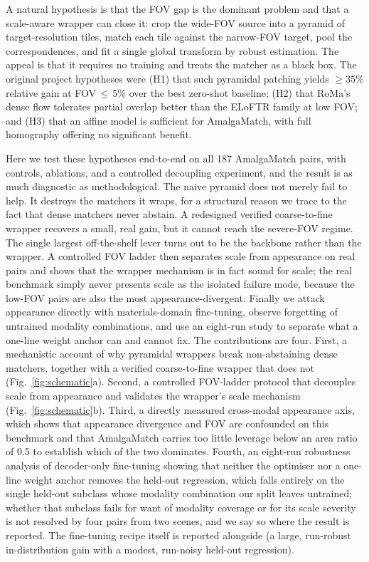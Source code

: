 \documentclass[fleqn,10pt]{wlscirep}
\begin{document}
A natural hypothesis is that the FOV gap is the dominant problem and that a scale-aware wrapper can close it: crop the wide-FOV source into a pyramid of target-resolution tiles, match each tile against the narrow-FOV target, pool the correspondences, and fit a single global transform by robust estimation. The appeal is that it requires no training and treats the matcher as a black box. The original project hypotheses were (H1) that such pyramidal patching yields $\ge35\%$ relative gain at FOV\,$\le$\,5\% over the best zero-shot baseline; (H2) that RoMa's dense flow tolerates partial overlap better than the ELoFTR family at low FOV; and (H3) that an affine model is sufficient for AmalgaMatch, with full homography offering no significant benefit.

Here we test these hypotheses end-to-end on all 187 AmalgaMatch pairs, with controls, ablations, and a controlled decoupling experiment, and the result is as much diagnostic as methodological. The naive pyramid does not merely fail to help. It destroys the matchers it wraps, for a structural reason we trace to the fact that dense matchers never abstain. A redesigned verified coarse-to-fine wrapper recovers a small, real gain, but it cannot reach the severe-FOV regime. The single largest off-the-shelf lever turns out to be the backbone rather than the wrapper. A controlled FOV ladder then separates scale from appearance on real pairs and shows that the wrapper mechanism is in fact sound for scale; the real benchmark simply never presents scale as the isolated failure mode, because the low-FOV pairs are also the most appearance-divergent. Finally we attack appearance directly with materials-domain fine-tuning, observe forgetting of untrained modality combinations, and use an eight-run study to separate what a one-line weight anchor can and cannot fix. The contributions are four. First, a mechanistic account of why pyramidal wrappers break non-abstaining dense matchers, together with a verified coarse-to-fine wrapper that does not (Fig.~\ref{fig:schematic}a). Second, a controlled FOV-ladder protocol that decouples scale from appearance and validates the wrapper's scale mechanism (Fig.~\ref{fig:schematic}b). Third, a directly measured cross-modal appearance axis, which shows that appearance divergence and FOV are confounded on this benchmark and that AmalgaMatch carries too little leverage below an area ratio of 0.5 to establish which of the two dominates. Fourth, an eight-run robustness analysis of decoder-only fine-tuning showing that neither the optimiser nor a one-line weight anchor removes the held-out regression, which falls entirely on the single held-out subclass whose modality combination our split leaves untrained; whether that subclass fails for want of modality coverage or for its scale severity is not resolved by four pairs from two scenes, and we say so where the result is reported. The fine-tuning recipe itself is reported alongside (a large, run-robust in-distribution gain with a modest, run-noisy held-out regression).
\end{document}
